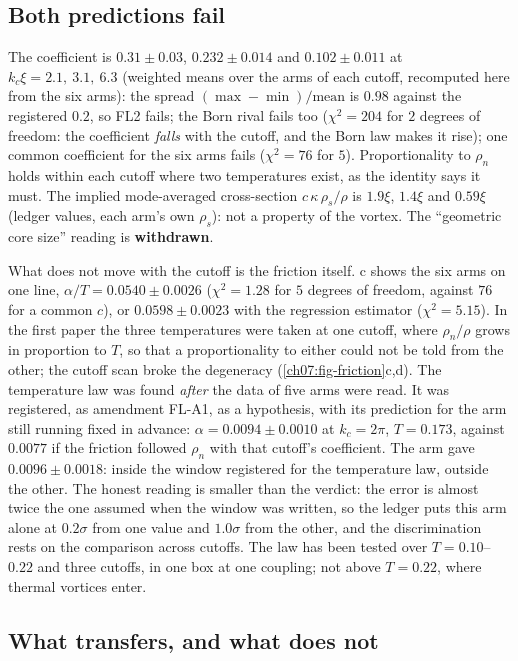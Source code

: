 \subsection*{Both predictions fail}

The coefficient is $0.31\pm0.03$, $0.232\pm0.014$ and $0.102\pm0.011$ at $k_c\xi=2.1,\ 3.1,\ 6.3$ (weighted means over the arms of each cutoff, recomputed here from the six arms): the spread $(\max-\min)/\text{mean}$ is $0.98$ against the registered $0.2$, so FL2 fails; the Born rival fails too ($\chi^2=204$ for $2$ degrees of freedom: the
coefficient \emph{falls} with the cutoff, and the Born law makes it rise); one common coefficient for the six arms fails ($\chi^2=76$ for $5$). Proportionality to $\rho_n$ holds within each cutoff where two temperatures exist, as the identity says it must. The implied mode-averaged cross-section $c\,\kappa\,\rho_s/\rho$ is $1.9\xi$, $1.4\xi$ and $0.59\xi$ (ledger values, each arm's own $\rho_s$): not a property of the vortex.
The ``geometric core size'' reading is \textbf{withdrawn}.

What does not move with the cutoff is the friction itself. c shows the six arms on one line, $\alpha/T=0.0540\pm0.0026$ ($\chi^2=1.28$ for $5$ degrees of freedom, against $76$ for a common $c$), or $0.0598\pm0.0023$ with the regression estimator ($\chi^2=5.15$). In the first paper the three temperatures were taken at one cutoff, where
$\rho_n/\rho$ grows in proportion to $T$, so that a proportionality to either could not be told from the other; the cutoff scan broke the degeneracy (\cref{ch07:fig-friction}c,d). The temperature law was found \emph{after} the data of five arms were read. It was registered, as amendment FL-A1, as a hypothesis, with its prediction for the arm still running fixed in advance: $\alpha=0.0094\pm0.0010$ at
$k_c=2\pi$, $T=0.173$, against $0.0077$ if the friction followed $\rho_n$ with that cutoff's coefficient. The arm gave $0.0096\pm0.0018$: inside the window registered for the temperature law, outside the other. The honest reading is smaller than the verdict: the error is almost twice the one assumed when the window was written, so the ledger puts this arm alone at $0.2\sigma$ from one value and $1.0\sigma$ from the other, and the
discrimination rests on the comparison across cutoffs. The law has been tested over $T=0.10$--$0.22$ and three cutoffs, in one box at one coupling; not above $T=0.22$, where thermal vortices enter.

\subsection*{What transfers, and what does not}

